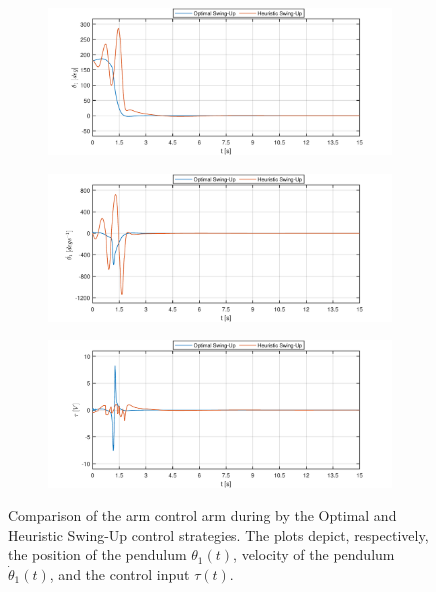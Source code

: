 \begin{figure}[H]
\centering
\begin{subfigure}
	\centering
	\includegraphics[scale=0.6]{images/Dswing/pend.pdf}  
\end{subfigure}
\begin{subfigure}
	\centering
	\includegraphics[scale=0.6]{images/Dswing/dpend.pdf}  
\end{subfigure}
\begin{subfigure}
	\centering
	\includegraphics[scale=0.6]{images/Dswing/control.pdf}  
\end{subfigure}
\caption{Comparison of the arm control arm during by the Optimal and Heuristic Swing-Up control strategies. The plots depict, respectively, the position of the pendulum $\theta_1(t)$, velocity of the pendulum $\dot{\theta}_1(t)$, and the control input $\tau(t)$.}
\label{results1}
\end{figure}
